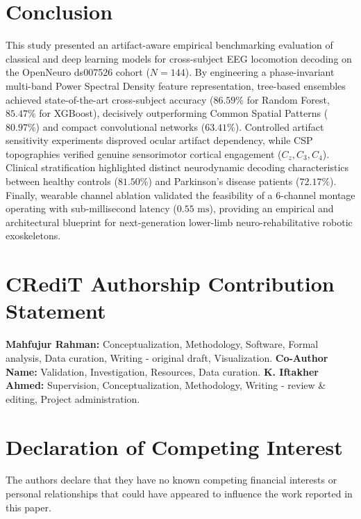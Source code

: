 \documentclass[review,12pt]{elsarticle}
\begin{document}
\section{Conclusion}
\label{sec:conclusion}
This study presented an artifact-aware empirical benchmarking evaluation of classical and deep learning models for cross-subject EEG locomotion decoding on the OpenNeuro ds007526 cohort ($N=144$). By engineering a phase-invariant multi-band Power Spectral Density feature representation, tree-based ensembles achieved state-of-the-art cross-subject accuracy ($86.59\%$ for Random Forest, $85.47\%$ for XGBoost), decisively outperforming Common Spatial Patterns ($80.97\%$) and compact convolutional networks ($63.41\%$). Controlled artifact sensitivity experiments disproved ocular artifact dependency, while CSP topographies verified genuine sensorimotor cortical engagement ($C_z, C_3, C_4$). Clinical stratification highlighted distinct neurodynamic decoding characteristics between healthy controls ($81.50\%$) and Parkinson's disease patients ($72.17\%$). Finally, wearable channel ablation validated the feasibility of a 6-channel montage operating with sub-millisecond latency ($0.55\text{ ms}$), providing an empirical and architectural blueprint for next-generation lower-limb neuro-rehabilitative robotic exoskeletons.

\section*{CRediT Authorship Contribution Statement}
\textbf{Mahfujur Rahman:} Conceptualization, Methodology, Software, Formal analysis, Data curation, Writing - original draft, Visualization. \textbf{Co-Author Name:} Validation, Investigation, Resources, Data curation. \textbf{K. Iftakher Ahmed:} Supervision, Conceptualization, Methodology, Writing - review \& editing, Project administration.

\section*{Declaration of Competing Interest}
The authors declare that they have no known competing financial interests or personal relationships that could have appeared to influence the work reported in this paper.
\end{document}
